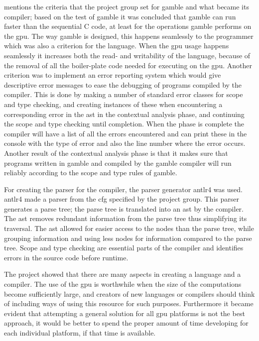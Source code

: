  mentions the criteria that the project group set for \gls{gamble} and what became its compiler; based on the test of \gls{gamble} it was concluded that \gls{gamble} can run faster than the sequential C code, at least for the operations \gls{gamble} performs on the \acrshort{gpu}.
The way \gls{gamble} is designed, this happens seamlessly to the programmer which was also a criterion for the language.
When the \acrshort{gpu} usage happens seamlessly it increases both the read- and writability of the language, because of the removal of all the boiler-plate code needed for executing on the \acrshort{gpu}.
Another criterion was to implement an error reporting system which would give descriptive error messages to ease the debugging of programs compiled by the compiler.
This is done by making a number of standard error classes for scope and type checking, and creating instances of these when encountering a corresponding error in the \acrshort{ast} in the contextual analysis phase, and continuing the scope and type checking until completion.
When the phase is complete the compiler will have a list of all the errors encountered and can print these in the console with the type of error and also the line number where the error occurs.
Another result of the contextual analysis phase is that it makes sure that programs written in \gls{gamble} and compiled by the \gls{gamble} compiler will run reliably according to the scope and type rules of \gls{gamble}.

For creating the parser for the compiler, the parser generator \acrshort{antlr}4 was used.
\acrshort{antlr}4 made a parser from the \acrshort{cfg} specified by the project group.
This parser generates a parse tree; the parse tree is translated into an \acrshort{ast} by the compiler.
The \acrshort{ast} removes redundant information from the parse tree thus simplifying its traversal.
The \acrshort{ast} allowed for easier access to the nodes than the parse tree, while grouping information and using less nodes for information compared to the parse tree.
Scope and type checking are essential parts of the compiler and identifies errors in the source code before runtime.

The project showed that there are many aspects in creating a language and a compiler.
The use of the \acrshort{gpu} is worthwhile when the size of the computations become sufficiently large, and creators of new languages or compilers should think of including ways of using this resource for such purposes.
Furthermore it became evident that attempting a general solution for all \acrshort{gpu} platforms is not the best approach, it would be better to spend the proper amount of time developing for each individual platform, if that time is available.